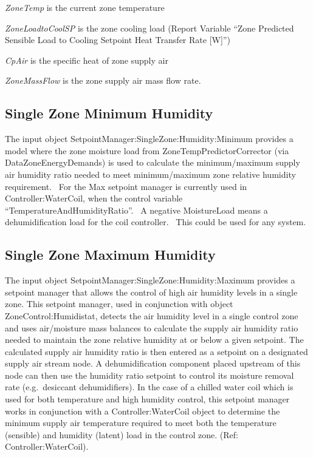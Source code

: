 \emph{ZoneTemp} is the current zone temperature

\emph{ZoneLoadtoCoolSP} is the zone cooling load (Report Variable ``Zone Predicted Sensible Load to Cooling Setpoint Heat Transfer Rate {[}W{]}'')

\emph{CpAir} is the specific heat of zone supply air

\emph{ZoneMassFlow} is the zone supply air mass flow rate.

\subsection{Single Zone Minimum Humidity}\label{single-zone-minimum-humidity}

The input object SetpointManager:SingleZone:Humidity:Minimum provides a model where the zone moisture load from ZoneTempPredictorCorrector (via DataZoneEnergyDemands) is used to calculate the minimum/maximum supply air humidity ratio needed to meet minimum/maximum zone relative humidity requirement.~ For the Max setpoint manager is currently used in Controller:WaterCoil, when the control variable ``TemperatureAndHumidityRatio''.~ A negative MoistureLoad means a dehumidification load for the coil controller.~ This could be used for any system.

\subsection{Single Zone Maximum Humidity}\label{single-zone-maximum-humidity}

The input object SetpointManager:SingleZone:Humidity:Maximum provides a setpoint manager that allows the control of high air humidity levels in a single zone. This setpoint manager, used in conjunction with object ZoneControl:Humidistat, detects the air humidity level in a single control zone and uses air/moisture mass balances to calculate the supply air humidity ratio needed to maintain the zone relative humidity at or below a given setpoint. The calculated supply air humidity ratio is then entered as a setpoint on a designated supply air stream node. A dehumidification component placed upstream of this node can then use the humidity ratio setpoint to control its moisture removal rate (e.g.~desiccant dehumidifiers). In the case of a chilled water coil which is used for both temperature and high humidity control, this setpoint manager works in conjunction with a Controller:WaterCoil object to determine the minimum supply air temperature required to meet both the temperature (sensible) and humidity (latent) load in the control zone. (Ref: Controller:WaterCoil).


